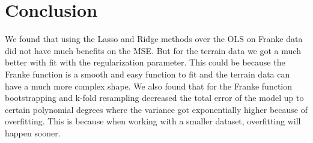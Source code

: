 \section{Conclusion}



We found that using the Lasso and Ridge methods over the OLS on Franke data did not have much benefits on the MSE. But for the terrain data we got a much better with fit with the regularization parameter. This could be because the Franke function is a smooth and easy function to fit and the terrain data can have a much more complex shape. We also found that for the Franke function bootstrapping and k-fold resampling decreased the total error of the model up to certain polynomial degrees where the variance got exponentially higher because of overfitting. This is because when working with a smaller dataset, overfitting will happen sooner. 